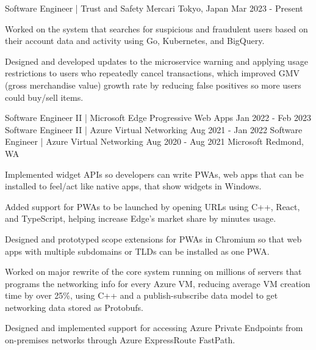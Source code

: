 

\begin{cventries}

    \cventry
    {Software Engineer | Trust and Safety} %
    {Mercari} %
    {Tokyo, Japan} %
    {Mar 2023 - Present} %
    {
        \begin{cvitems} %
            \item {Worked on the system that searches for suspicious and fraudulent users based on their account data and activity using Go, Kubernetes, and BigQuery.}
            \item {Designed and developed updates to the microservice warning and applying usage restrictions to users who repeatedly cancel transactions, which improved GMV (gross merchandise value) growth rate by reducing false positives so more users could buy/sell items.}
        \end{cvitems}
    }

    \cventrythreepositions
    {Software Engineer II | Microsoft Edge Progressive Web Apps}
    {Jan 2022 - Feb 2023}
    {Software Engineer II | Azure Virtual Networking}
    {Aug 2021 - Jan 2022}
    {Software Engineer | Azure Virtual Networking}
    {Aug 2020 - Aug 2021}
    {Microsoft}
    {Redmond, WA}
    {
        \begin{cvitems} %
            \item {Implemented widget APIs so developers can write PWAs, web apps that can be installed to feel/act like native apps, that show widgets in Windows.}
            \item {Added support for PWAs to be launched by opening URLs using C++, React, and TypeScript, helping increase Edge's market share by minutes usage.}
            \item {Designed and prototyped scope extensions for PWAs in Chromium so that web apps with multiple subdomains or TLDs can be installed as one PWA.}
        \end{cvitems}
    }
    {
        \begin{cvitems} %
            \item {Worked on major rewrite of the core system running on millions of servers that programs the networking info for every Azure VM, reducing average VM creation time by over 25\%, using C++ and a publish-subscribe data model to get networking data stored as Protobufs.}
            \item {Designed and implemented support for accessing Azure Private Endpoints from on-premises networks through Azure ExpressRoute FastPath.}
        \end{cvitems}
    }


\end{cventries}
